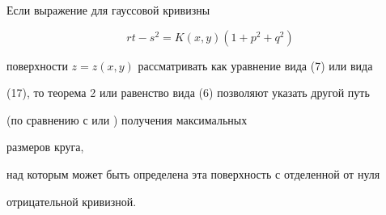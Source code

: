  


\begin{note} Если выражение для гауссовой кривизны 


$$ 


rt-s^2=K(x,y)(1+p^2+q^2) 


$$ 


поверхности $z=z(x,y)$ рассматривать как уравнение вида (7) или вида 


(17), то теорема 2 или равенство вида (6) позволяют указать другой путь 


(по сравнению с \cite{Ef2} или \cite{Hei}) получения максимальных 


размеров круга, 


над которым может быть определена эта поверхность с отделенной от нуля 


отрицательной кривизной. 


\end{note} 


 


